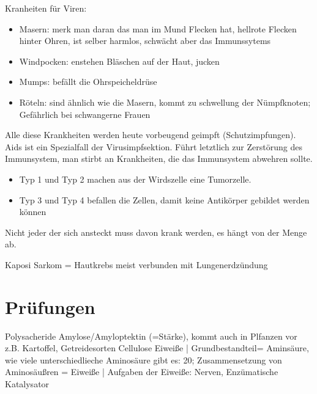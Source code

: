 \documentclass[a4paper]{article}
\begin{document}
Kranheiten für Viren:

\begin{itemize}
\item Masern: merk man daran das man im Mund Flecken hat, hellrote Flecken hinter Ohren, ist selber harmlos, schwächt aber das Immunssytems
\item Windpocken: enstehen Bläschen auf der Haut, jucken
\item Mumps: befällt die Ohrspeicheldrüse
\item Röteln: sind ähnlich wie die Masern, kommt zu schwellung der Nümpfknoten; Gefährlich bei schwangerne Frauen

\end{itemize}

Alle diese Krankheiten werden heute vorbeugend geimpft (Schutzimpfungen). Aids ist ein Spezialfall der Virusimpfsektion. Führt letztlich zur Zerstörung des Immunsystem, man stirbt an Krankheiten, die das Immunsystem abwehren sollte.

\begin{itemize}
\item Typ 1 und Typ 2 machen aus der Wirdszelle eine Tumorzelle.
\item Typ 3 und Typ 4 befallen die Zellen, damit keine Antikörper gebildet werden können
\end{itemize}

Nicht jeder der sich ansteckt muss davon krank werden, es hängt von der Menge ab.

Kaposi Sarkom = Hautkrebs meist verbunden mit Lungenerdzündung

\section{Prüfungen}

Polysacheride Amylose/Amyloptektin (=Stärke), kommt auch in Plfanzen vor z.B. Kartoffel, Getreidesorten
Cellulose
Eiweiße | Grundbestandteil= Aminsäure, wie viele unterschiedlieche Aminosäure gibt es: 20; Zusammensetzung von Aminosäußren = Eiweiße | Aufgaben der Eiweiße: Nerven, Enzümatische Katalysator
\end{document}
